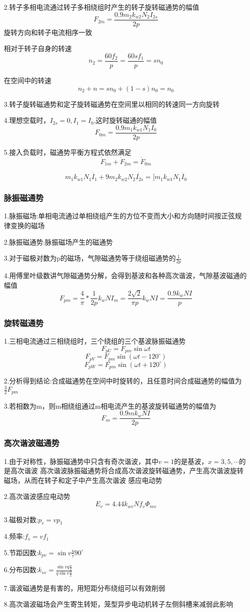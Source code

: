 \documentclass[11pt,twoside,a4paper]{ctexart}
\begin{document}
2.转子多相电流通过转子多相绕组时产生的转子旋转磁通势的幅值
\[F_{2m} = \frac{0.9m_2k_{w2}N_2I_{2s}}{2p}\]
旋转方向和转子电流相序一致

相对于转子自身的转速
\[n_2 = \frac{60f_2}{p} = \frac{60sf_1}{p} = sn_0\]

在空间中的转速
\[n_2 + n = sn_0 + (1 - s)n_0 = n_0\]

3.转子旋转磁通势和定子旋转磁通势在空间里以相同的转速同一方向旋转

4.理想空载时，$I_{2s} = 0,I_1 = I_0$,这时旋转磁通的幅值
\[F_{0m} = \frac{0.9m_1k_{w1}N_1I_0}{2p}\]

5.接入负载时，磁通势平衡方程式依然满足
\[\dot{F}_{1m} + \dot{F}_{2m} = \dot{F}_{0m}\]

\[m_1k_{w1}N_1\dot{I_1} + 9m_2k_{w2}N_2\dot{I_{2s}} = [m_1k_{w1}N_1\dot{I_0}\]

\subsubsection{脉振磁通势}
1.脉振磁场:单相电流通过单相绕组产生的方位不变而大小和方向随时间按正弦规律变换的磁场

2.脉振磁通势:脉振磁场产生的磁通势

3.对于磁极对数为p的磁场，气隙磁通势等于绕组磁通势的$\frac{1}{2p}$

4.用傅里叶级数讲气隙磁通势分解，会得到基波和各种高次谐波，气隙基波磁通的幅值
\[F_{pm} = \frac{4}{\pi }*\frac{1}{2p}k_wNI_m = \frac{2\sqrt 2}{\pi p}k_wNI = \frac{0.9k_wNI}{p}\]

\subsubsection{旋转磁通势}
1.三相电流通过三相绕组时，三个绕组的三个基波脉振磁通势
\[F_{pU} = F_{pm}\sin \omega t\] 
\[F_{pV} = F_{pm}\sin (\omega t - 120^\circ )\]
\[F_{pW} = F_{pm}\sin (\omega t + 120^\circ )\]

2.分析得到结论:合成磁通势在空间中时旋转的，且任意时间合成磁通势的幅值为$\frac{3}{2}F_{pm}$

3.若相数为m，则m相绕组通过m相电流产生的基波旋转磁通势的幅值为
\[F_m = \frac{0.9mk_wNI}{2p}\]

\subsubsection{高次谐波磁通势}
1.由于对称性，脉振磁通势中只含有奇次谐波，其中$v = 1$的是基波，$x = 3,5,\cdots $的是高次谐波
高次谐波脉振磁通势将合成高次谐波旋转磁通势，产生高次谐波旋转磁场，从而在转子和定子中产生高次谐波
感应电动势

2.高次谐波感应电动势
\[E_v = 4.44k_{wv}Nf_v\varPhi _{mv}\]

3.磁极对数:$p_v = vp_1$

4.频率:$f_v = vf_1$

5.节距因数:$k_{pv} = \sin v\frac{y}{\tau }90^\circ $

6.分布因数:$k_{sv} = \frac{\sin vq\frac{\alpha}{2}}{q\sin v\frac{\alpha}{2}} $

7.谐波磁通势是有害的，用短距分布绕组可以有效削弱

8.高次谐波磁场会产生寄生转矩，笼型异步电动机转子左侧斜槽来减弱此影响
\end{document}
